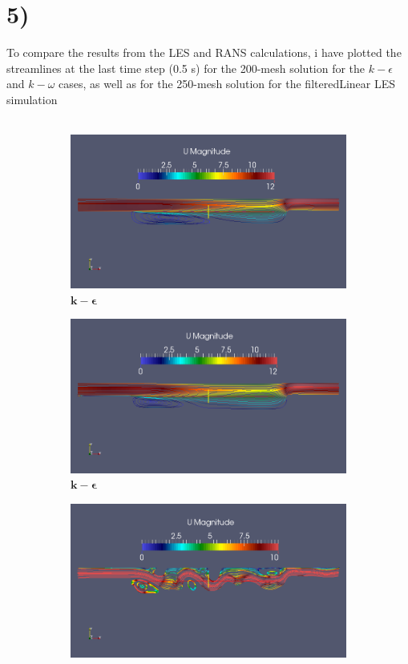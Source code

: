 \documentclass[a4paper,english,11pt,twoside]{article}
\begin{document}
\section*{5)}
To compare the results from the LES and RANS calculations, i have plotted the streamlines at the last time step (0.5 s) for the 200-mesh solution for the $k-\epsilon$ and $k-\omega$ cases, as well as for the 250-mesh solution for the filteredLinear LES simulation\\
\\
\begin{figure}[h!]
	\begin{subfigure}{0.3\linewidth}
		\includegraphics[width=0.95\linewidth]{simple_ke_20_streamlines.png}
		\caption{$\mathbf{k-\epsilon}$}
	\end{subfigure}
	\begin{subfigure}{0.3\linewidth}
		\includegraphics[width=0.95\linewidth]{simple_ko_20_streamlines.png}
		\caption{$\mathbf{k-\epsilon}$}
	\end{subfigure}
	\begin{subfigure}{0.3\linewidth}
		\includegraphics[width=0.95\linewidth]{piso_25_filteredLinear_streamlines.png}

\end{subfigure}
\end{figure}
\end{document}
